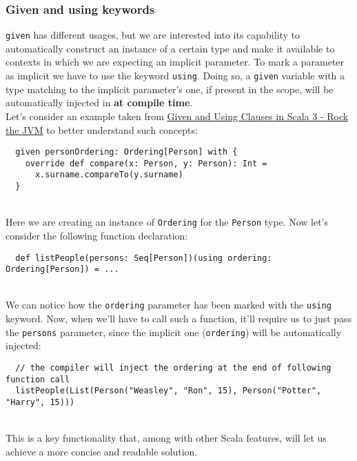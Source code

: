 \subsubsection{Given and using keywords}
\label{par:given-using}
\texttt{given} has different usages, but we are interested into its capability to automatically construct an instance of a certain type and make it available to contexts in which we are expecting an implicit parameter.
To mark a parameter as implicit we have to use the keyword \texttt{using}.
Doing so, a \texttt{given} variable with a type matching to the implicit parameter's one, if present in the scope, will be automatically injected in \textbf{at compile time}.\\
Let's consider an example taken from \href{https://blog.rockthejvm.com/scala-3-given-using/}{Given and Using Clauses in Scala 3 - Rock the JVM} to better understand such concepts:
\begin{verbatim}
  given personOrdering: Ordering[Person] with {
    override def compare(x: Person, y: Person): Int = 
      x.surname.compareTo(y.surname)
  }
\end{verbatim}\mbox{}\\
Here we are creating an instance of \texttt{Ordering} for the \texttt{Person} type.
Now let's consider the following function declaration:
\begin{verbatim}
  def listPeople(persons: Seq[Person])(using ordering: Ordering[Person]) = ...
\end{verbatim}\mbox{}\\
We can notice how the \texttt{ordering} parameter has been marked with the \texttt{using} keyword.
Now, when we'll have to call such a function, it'll require us to just pass the \texttt{persons} parameter, since the implicit one (\texttt{ordering}) will be automatically injected:
\begin{verbatim}
  // the compiler will inject the ordering at the end of following function call
  listPeople(List(Person("Weasley", "Ron", 15), Person("Potter", "Harry", 15)))
\end{verbatim}\mbox{}\\
This is a key functionality that, among with other Scala features, will let us achieve a more concise and readable solution.


